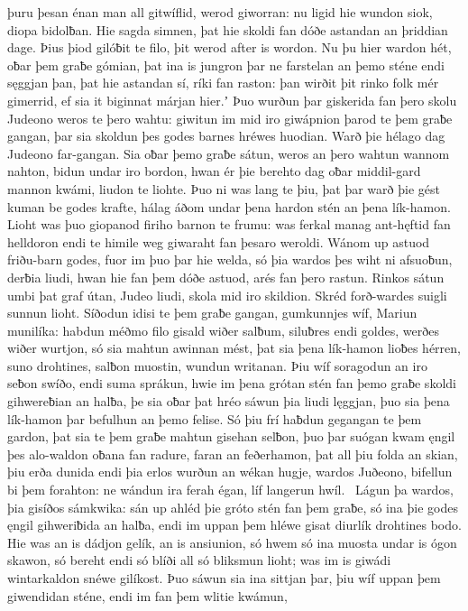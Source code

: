 þuru þesan énan man all gitwíflid,
werod giworran: nu ligid hie wundon siok,
diopa bidolƀan. Hie sagda simnen, þat hie skoldi fan dóðe astandan
an þriddian dage. Þius þiod gilóƀit te filo,
þit werod after is wordon. Nu þu hier wardon hét,
oƀar þem graƀe gómian, þat ina is jungron þar
ne farstelan an þemo sténe endi sęggjan þan, þat hie astandan sí,
ríki fan raston: þan wirðit þit rinko folk
mér gimerrid, ef sia it biginnat márjan hier.ʼ
Þuo wurðun þar giskerida fan þero skolu Judeono
weros te þero wahtu: giwitun im mid iro giwápnion þarod
te þem graƀe gangan, þar sia skoldun þes godes barnes
hréwes huodian. Warð þie hélago dag
Judeono far-gangan. Sia oƀar þemo graƀe sátun,
weros an þero wahtun wannom nahton,
bidun undar iro bordon, hwan ér þie berehto dag
oƀar middil-gard mannon kwámi,
liudon te liohte. Þuo ni was lang te þiu,
þat þar warð þie gést kuman be godes krafte,
hálag áðom undar þena hardon stén
an þena lík-hamon. Lioht was þuo giopanod
firiho barnon te frumu: was ferkal manag
ant-hęftid fan helldoron endi te himile weg
giwaraht fan þesaro weroldi. Wánom up astuod
friðu-barn godes, fuor im þuo þar hie welda,
só þia wardos þes wiht ni afsuoƀun,
derƀia liudi, hwan hie fan þem dóðe astuod,
arés fan þero rastun. Rinkos sátun
umbi þat graf útan, Judeo liudi,
skola mid iro skildion. Skréd forð-wardes
suigli sunnun lioht. Síðodun idisi
te þem graƀe gangan, gumkunnjes wíf,
Mariun munilíka: habdun méðmo filo
gisald wiðer salƀum, siluƀres endi goldes,
werðes wiðer wurtjon, só sia mahtun awinnan mést,
þat sia þena lík-hamon lioƀes hérren,
suno drohtines, salƀon muostin,
wundun writanan. Þiu wíf soragodun
an iro seƀon swíðo, endi suma sprákun,
hwie im þena grótan stén fan þemo graƀe skoldi
gihwereƀian an halƀa, þe sia oƀar þat hréo sáwun
þia liudi lęggjan, þuo sia þena lík-hamon þar
befulhun an þemo felise. Só þiu frí haƀdun
gegangan te þem gardon, þat sia te þem graƀe mahtun
gisehan selƀon, þuo þar suógan kwam
ęngil þes alo-waldon oƀana fan radure,
faran an feðerhamon, þat all þiu folda an skian,
þiu erða dunida endi þia erlos wurðun
an wékan hugje, wardos Juðeono,
bifellun bi þem forahton: ne wándun ira ferah égan,
líf langerun hwíl. \hld\ Lágun þa wardos,
þia gisíðos sámkwika: sán up ahléd
þie gróto stén fan þem graƀe, só ina þie godes ęngil
gihweriƀida an halƀa, endi im uppan þem hléwe gisat
diurlík drohtines bodo. Hie was an is dádjon gelík,
an is ansiunion, só hwem só ina muosta undar is ógon skawon,
só bereht endi só blíði all só bliksmun lioht;
was im is giwádi wintarkaldon
snéwe gilíkost. Þuo sáwun sia ina sittjan þar,
þiu wíf uppan þem giwendidan sténe, endi im fan þem wlitie kwámun,
